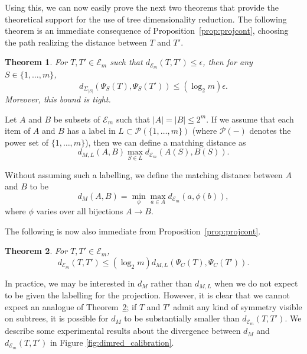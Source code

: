 \documentclass[a4paper,11pt]{article}
\newtheorem{theorem}{Theorem}
\newcommand{\aE}{\mathcal{E}}
\newcommand{\aP}{\mathcal{P}}
\begin{document}
Using this, we can now easily prove the next two theorems that provide the theoretical support for the use of tree dimensionality reduction.
The following theorem is an immediate consequence of Proposition~\ref{prop:projcont}, choosing the path realizing the distance between $T$ and $T'$.

\begin{theorem}
For $T,T' \in \aE_m$ such that $d_{\aE_m}(T,T') \leq \epsilon$, then for any $S \in \{1,\ldots,m\}$,
\[
d_{\Sigma_{|S|}}(\Psi_S(T), \Psi_S(T')) \leq (\log_2 m)\epsilon.
\]
Moreover, this bound is tight.
\end{theorem}

Let $A$ and $B$ be subsets of $\aE_m$ such that $|A| = |B| \leq 2^m$.
If we assume that each item of $A$ and $B$ has a label in $L \subset \aP(\{1,\ldots,m\})$ (where $\aP(-)$ denotes the power set of $\{1,\ldots,m\}$), then we can define a matching distance as
\[
d_{M,L}(A,B) \max_{S \in L} d_{\aE_m}(A(S), B(S)).
\]

Without assuming such a labelling, we define the matching distance between $A$ and $B$ to be 
\[
d_M(A,B) = \min_{\phi} \max_{a \in A} d_{\aE_m}(a,\phi(b)),
\]
where $\phi$ varies over all bijections $A \to B$.

The following is now also immediate from Proposition~\ref{prop:projcont}.

\begin{theorem}\label{thm:converse}
For $T, T' \in \aE_m$, 
\[
d_{\aE_m}(T,T') \leq (\log_2 m) d_{M,L}(\Psi_C(T), \Psi_C(T')).
\]
\end{theorem}

In practice, we may be interested in $d_M$ rather than $d_{M,L}$ when we do not expect to be given the labelling for the projection.
However, it is clear that we cannot expect an analogue of Theorem~\ref{thm:converse}; if $T$ and $T'$ admit any kind of symmetry visible on subtrees, it is possible for $d_M$ to be substantially smaller than $d_{\aE_m}(T,T')$.
We describe some experimental results about the divergence between $d_M$ and $d_{\aE_m}(T,T')$ in Figure \ref{fig:dimred_calibration}.
\end{document}
